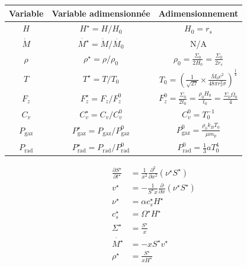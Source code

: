 \documentclass[french]{beamer}
\begin{document}
\begin{frame}
\begin{center}
    \begin{tabular}{|c|c|c|}
        \hline
        Variable & Variable adimensionnée & Adimensionnement \\
        \hline
         $H$ & $H^\star = H/H_0$ & $H_0 = r_s$ \\
        $\dot{M}$ & $\dot{M^\star} = \dot{M}/\dot{M_0}$ & N/A \\
        $\rho$ & $\rho^\star = \rho/\rho_0$ & $\rho_0 = \frac{\Sigma_0}{2 H_0} = \frac{\Sigma_0}{2 r_s}$ \\	
        $T$ & $T^\star = T/T_0$ & $T_0 = \left(\frac{1}{\sqrt{27}} \times \frac{\dot{M_0} c^2}{48 \pi r_s^2 \sigma} \right)^\frac{1}{4}$ \\
$F_z$ & $F_z^\star = F_z/F_z^0$ & $F_z^0 = \frac{\Sigma_0}{2 t_0} = \frac{\rho_0 H_0}{t_0} = \frac{\Sigma_0 \Omega_0}{4}$ \\
        $C_v$ & $C_v^\star = C_v/C_v^0$ & $C_v^0 = T_0^{-1}$ \\
        $P_\mathrm{gaz}$ & $P_\mathrm{gaz}^\star = P_\mathrm{gaz}/P_\mathrm{gaz}^0$ & $P_\mathrm{gaz}^0 = \frac{\rho_0 k_B T_0}{\mu m_p}$ \\
        $P_\mathrm{rad}$ & $P_\mathrm{rad}^\star = P_\mathrm{rad}/P_\mathrm{rad}^0$ & $P_\mathrm{rad}^0 = \frac{1}{3} a T_0^4$ \\
	     \hline
    \end{tabular}
\end{center}
\end{frame}

\begin{frame}
	\begin{equation*}
    \begin{aligned}
        \frac{\partial S^\star}{\partial t^\star} &= \frac{1}{x^2} \frac{\partial^2}{\partial x^2} \left(\nu^\star S^\star\right) \\
        v^\star &= - \frac{1}{S^\star x} \frac{\partial}{\partial x} \left(\nu^\star S^\star\right) \\
        \nu^\star &= \alpha c_s^\star H^\star \\
        c_s^\star &= \Omega^\star H^\star \\
        \Sigma^\star &= \frac{S^\star}{x} \\
        \dot{M^\star} &= - x S^\star v^\star \\
        \rho^\star &= \frac{S^\star}{x H^\star} \\
    \end{aligned}
\end{equation*}
\end{frame} 
\end{document}
